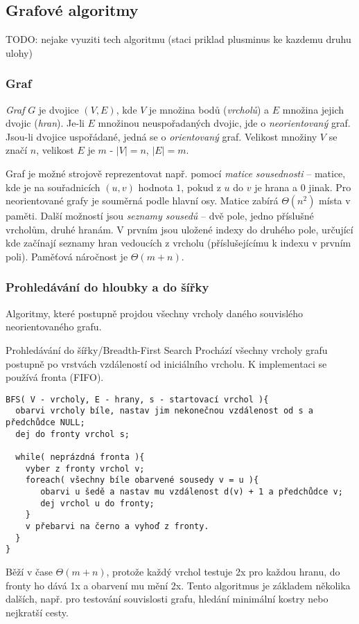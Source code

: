 \def\Real{ \mathbb{R} }

\subsection{Grafové algoritmy}

TODO: nejake vyuziti tech algoritmu (staci priklad plusminus ke kazdemu druhu ulohy)

\subsubsection*{Graf}

\begin{definice}
\emph{Graf} $G$ je dvojice $(V,E)$, kde $V$ je množina bodů (\emph{vrcholů}) a $E$ množina jejich dvojic (\emph{hran}). Je-li $E$ množinou neuspořadaných dvojic, jde o \emph{neorientovaný} graf. Jsou-li dvojice uspořádané, jedná se o \emph{orientovaný} graf. Velikost množiny $V$ se značí $n$, velikost $E$ je $m$ - $|V|=n$, $|E|=m$. 

Graf je možné strojově reprezentovat např. pomocí \emph{matice sousednosti} -- matice, kde je na souřadnicích $(u,v)$ hodnota $1$, pokud z $u$ do $v$ je hrana a $0$ jinak. Pro neorientované grafy je souměrná podle hlavní osy. Matice zabírá $\Theta(n^2)$ místa v paměti. Další možností jsou \emph{seznamy sousedů} -- dvě pole, jedno příslušné vrcholům, druhé hranám. V prvním jsou uložené indexy do druhého pole, určující kde začínají seznamy hran vedoucích z vrcholu (příslušejícímu k indexu v prvním poli). Paměťová náročnost je $\Theta(m+n)$.
\end{definice}

\subsubsection*{Prohledávání do hloubky a do šířky}

Algoritmy, které postupně projdou všechny vrcholy daného souvislého neorientovaného grafu.

\begin{algoritmusN}{Prohledávání do šířky/Breadth-First Search}
Prochází všechny vrcholy grafu postupně po vrstvách vzdáleností od iniciálního vrcholu. K implementaci se používá fronta (FIFO).

\begin{verbatim}
BFS( V - vrcholy, E - hrany, s - startovací vrchol ){
  obarvi vrcholy bíle, nastav jim nekonečnou vzdálenost od s a předchůdce NULL;
  dej do fronty vrchol s;

  while( neprázdná fronta ){
    vyber z fronty vrchol v;
    foreach( všechny bíle obarvené sousedy v = u ){
       obarvi u šedě a nastav mu vzdálenost d(v) + 1 a předchůdce v;
       dej vrchol u do fronty;
    }
    v přebarvi na černo a vyhoď z fronty.
  }
}
\end{verbatim}


Běží v čase $\Theta(m+n)$, protože každý vrchol testuje 2x pro každou hranu, do fronty ho dává 1x a obarvení mu mění 2x. Tento algoritmus je základem několika dalších, např. pro testování souvislosti grafu, hledání minimální kostry nebo nejkratší cesty.
\end{algoritmusN}


